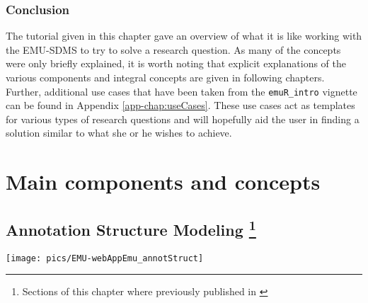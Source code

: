 \documentclass[
]{book}
\begin{document}
\hypertarget{conclusion}{%
\section{Conclusion}\label{conclusion}}

The tutorial given in this chapter gave an overview of what it is like working with the EMU-SDMS to try to solve a research question. As many of the concepts were only briefly explained, it is worth noting that explicit explanations of the various components and integral concepts are given in following chapters. Further, additional use cases that have been taken from the \texttt{emuR\_intro} vignette can be found in Appendix \ref{app-chap:useCases}. These use cases act as templates for various types of research questions and will hopefully aid the user in finding a solution similar to what she or he wishes to achieve.

\hypertarget{part-main-components-and-concepts}{%
\part{Main components and concepts}\label{part-main-components-and-concepts}}

\hypertarget{chap:annot-struct-mod}{%
\chapter[Annotation Structure Modeling ]{\texorpdfstring{Annotation Structure Modeling \footnote{Sections of this chapter where previously published in \citet{winkelmann:2017aa}}}{Annotation Structure Modeling }}\label{chap:annot-struct-mod}}

\begin{center}\texttt{[image: pics/EMU-webAppEmu\_annotStruct]} \end{center}
\end{document}
